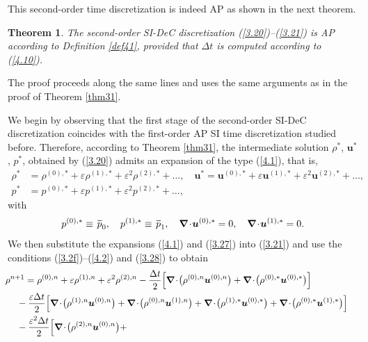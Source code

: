 \documentclass[A4paper,12pt,twoside]{article}
\newtheorem{theorem}{Theorem}[section]
\newenvironment{proof}{{\flushleft \bf Proof:}}{}
\numberwithin{equation}{section}
\numberwithin{figure}{section}
\numberwithin{table}{section}
\def\bnabla{\bm{\nabla}}
\newcommand{\dt}{\Delta t}
\newcommand{\ve}{\varepsilon}
\newcommand\eref[1]{(\ref{#1})}
\newcommand*\xbar[1]{%
  \hbox{%
    \vbox{%
      \hrule height 0.5pt %
      \kern0.4ex%
      \hbox{%
        \kern-0.05em%
        \ensuremath{#1}%
        \kern-0.00em%
      }%
    }%
  }%
}
\begin{document}
This second-order time discretization is indeed AP as shown in the next theorem.
\begin{theorem}
The second-order SI-DeC discretization \eref{3.20}--\eref{3.21} is AP according to Definition \ref{def41}, provided that $\dt$ is computed
according to \eref{4.10}.
\end{theorem}
\begin{proof}
The proof proceeds along the same lines and uses the same arguments as in the proof of Theorem \ref{thm31}.
	
We begin by observing that the first stage of the second-order SI-DeC discretization coincides with the first-order AP SI time 
discretization studied before. Therefore, according to Theorem \ref{thm31}, the intermediate solution $\rho^*$, $\bm u^*$, $p^*$, obtained 
by \eref{3.20} admits an expansion of the type \eref{4.1}, that is,
\begin{equation}
\begin{aligned}
\rho^*&=\rho^{(0),*}+\ve\rho^{(1),*}+\ve^2\rho^{(2),*}+\dots,\quad\bm u^*=\bm u^{(0),*}+\ve\bm u^{(1),*}+\ve^2\bm u^{(2),*}+\dots,\\
p^*&=p^{(0),*}+\ve p^{(1),*}+\ve^2p^{(2),*}+\dots,
\end{aligned}
\label{3.27}
\end{equation}
with
\begin{equation}
p^{(0),*}\equiv\,\xbar p_0,\quad p^{(1),*}\equiv\,\xbar p_1,\quad\bnabla\!\cdot\!\bm u^{(0),*}=0,\quad\bnabla\!\cdot\!\bm u^{(1),*}=0.
\label{3.28}
\end{equation}
We then substitute the expansions \eref{4.1} and \eref{3.27} into \eref{3.21} and use the conditions \eref{3.2f}--\eref{4.2} and \eref{3.28}
to obtain
\begin{align}
&\hspace*{-0.1cm}\begin{aligned}
\rho^{n+1}&=\rho^{(0),n}+\ve\rho^{(1),n}+\ve^2\rho^{(2),n}-\frac{\dt}{2}\Big[\bnabla\!\cdot\!\big(\rho^{(0),n}\bm u^{(0),n}\big)+
\bnabla\!\cdot\!\big(\rho^{(0),*}\bm u^{(0),*}\big)\Big]\\
&\hspace*{-0.3cm}-\frac{\ve\dt}{2}\Big[\bnabla\!\cdot\!\big(\rho^{(1),n}\bm u^{(0),n}\big)+
\bnabla\!\cdot\!\big(\rho^{(0),n}\bm u^{(1),n}\big)+\bnabla\!\cdot\!\big(\rho^{(1),*}\bm u^{(0),*}\big)+
\bnabla\!\cdot\!\big(\rho^{(0),*}\bm u^{(1),*}\big)\Big]\\
&\hspace*{-0.3cm}-\frac{\ve^2\dt}{2}\Big[\bnabla\!\cdot\!\big(\rho^{(2),n}\bm u^{(0),n}\big)+

\end{aligned}
\end{align}
\end{proof}
\end{document}
